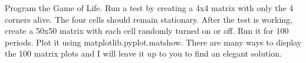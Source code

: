 \documentclass[12pt]{article}
\begin{document}
Program the Game of Life. Run a test by creating a 4x4 matrix with only the 4 corners alive. The four cells should remain stationary. After the test is working, create a 50x50 matrix with each cell randomly turned on or off. Run it for 100 periods. Plot it using matplotlib.pyplot.matshow. There are many ways to display the 100 matrix plots and I will leave it up to you to find an elegant solution.
\end{document}
